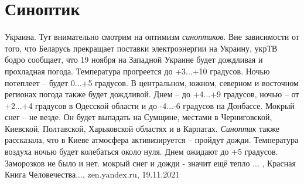  
 
 
 
 
\chapter{Синоптик}

Украина. Тут внимательно смотрим на оптимизм \emph{синоптиков}. Вне зависимости от
того, что Беларусь прекращает поставки электроэнергии на Украину, укрТВ бодро
сообщает, что 19 ноября на Западной Украине будет дождливая и прохладная
погода. Температура прогреется до +3...+10 градусов. Ночью потеплеет – будет
0...+5 градусов.  В центральном, южном, северном и восточном регионах погода
также будет дождливой. Днем – до +4...+9 градусов, ночью – от +2...+4 градусов
в Одесской области и до -4...-6 градусов на Донбассе.  Мокрый снег – не везде.
Он будет выпадать на Сумщине, местами в Черниговской, Киевской, Полтавской,
Харьковской областях и в Карпатах.  \emph{Синоптик} также рассказала, что в Киеве
атмосфера активизируется – пройдут дожди. Температура воздуха ночью будет
колебаться около нуля. Днем ожидают до +5 градусов. Заморозков не было и нет.
мокрый снег и дожди - значит ещё тепло ...
, Красная Книга Человечества..., zen.yandex.ru, 19.11.2021

